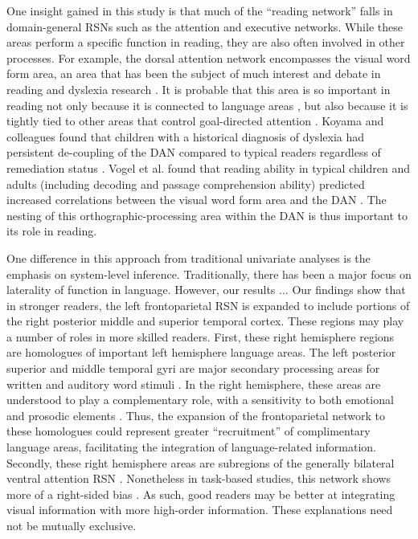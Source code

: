 One insight gained in this study is that much of the ``reading network'' falls in domain-general RSNs such as the attention and executive networks. While these areas perform a specific function in reading, they are also often involved in other processes. For example, the dorsal attention network encompasses the visual word form area, an area that has been the subject of much interest and debate in reading and dyslexia research \citep{McCandliss2003}. It is probable that this area is so important in reading not only because it is connected to language areas \citep{Bouhali2014}, but also because it is tightly tied to other areas that control goal-directed attention \citep{Vogel2014}. Koyama and colleagues found that children with a historical diagnosis of dyslexia had persistent de-coupling of the DAN compared to typical readers regardless of remediation status \citep{Koyama2013}. Vogel et al. found that reading ability in typical children and adults (including decoding and passage comprehension ability) predicted increased correlations between the visual word form area and the DAN \citep{Vogel2012a}. The nesting of this orthographic-processing area within the DAN is thus important to its role in reading.

One difference in this approach from traditional univariate analyses is the emphasis on system-level inference. Traditionally, there has been a major focus on laterality of function in language. However, our results ... Our findings show that in stronger readers, the left frontoparietal RSN is expanded to include portions of the right posterior middle and superior temporal cortex.  These regions may play a number of roles in more skilled readers.  First, these right hemisphere regions are homologues of important left hemisphere language areas. The left posterior superior and middle temporal gyri are major secondary processing areas for written and auditory word stimuli \citep{Price2012}. In the right hemisphere, these areas are understood to play a complementary role, with a sensitivity to both emotional and prosodic elements \citep{Jung-Beeman2005}. Thus, the expansion of the frontoparietal network to these homologues could represent greater ``recruitment'' of complimentary language areas, facilitating  the integration of language-related information.  Secondly, these right hemisphere areas are subregions of the generally bilateral ventral attention RSN \citep{Yeo2011}.  Nonetheless in task-based studies, this network shows more of a right-sided bias \citep{Fox2006}.  As such, good readers may be better at integrating visual information with more high-order information.  These explanations need not be mutually exclusive.

